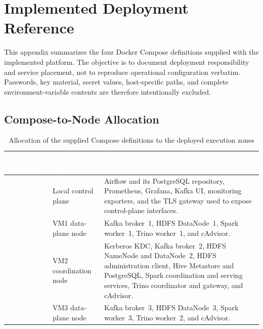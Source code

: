 \chapter{Implemented Deployment Reference}
\label{app:deployment-reference}

This appendix summarizes the four Docker Compose definitions supplied with the implemented platform. The objective is to document deployment responsibility and service placement, not to reproduce operational configuration verbatim. Passwords, key material, secret values, host-specific paths, and complete environment-variable contents are therefore intentionally excluded.

\section{Compose-to-Node Allocation}

\begin{table}[H]
    \centering
    \footnotesize
    \renewcommand{\arraystretch}{1.14}
    \begin{tabularx}{\textwidth}{|L{3.3cm}|L{2.5cm}|Y|}
        \hline
        \textcolor{white}{\textbf{Source definition}} & \textcolor{white}{\textbf{Execution zone}} & \textcolor{white}{\textbf{Architectural responsibility}} \\
        \hline
         & Local control plane & Airflow and its PostgreSQL repository, Prometheus, Grafana, Kafka UI, monitoring exporters, and the TLS gateway used to expose control-plane interfaces. \\
        \hline
         & VM1 data-plane node & Kafka broker~1, HDFS DataNode~1, Spark worker~1, Trino worker~1, and cAdvisor. \\
        \hline
         & VM2 coordination node & Kerberos KDC, Kafka broker~2, HDFS NameNode and DataNode~2, HDFS administration client, Hive Metastore and PostgreSQL, Spark coordination and serving services, Trino coordinator and gateway, and cAdvisor. \\
        \hline
         & VM3 data-plane node & Kafka broker~3, HDFS DataNode~3, Spark worker~3, Trino worker~2, and cAdvisor. \\
        \hline
    \end{tabularx}
    \caption{Allocation of the supplied Compose definitions to the deployed execution zones}
    \label{tab:appendix-compose-files}
\end{table}

